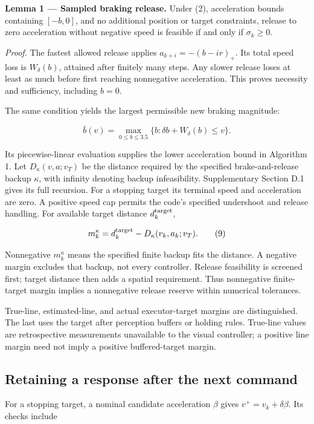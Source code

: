 \documentclass[letterpaper,journal]{IEEEtran}
\begin{document}
\textbf{Lemma 1 --- Sampled braking release.} Under (2), acceleration bounds containing \([-b,0]\), and no additional position or target constraints, release to zero acceleration without negative speed is feasible if and only if \(\sigma_k\ge0\).

\emph{Proof.} The fastest allowed release applies \(a_{k+i}=-(b-ir)_+\). Its total speed loss is \(W_\delta(b)\), attained after finitely many steps. Any slower release loses at least as much before first reaching nonnegative acceleration. This proves necessity and sufficiency, including \(b=0\).

The same condition yields the largest permissible new braking magnitude:

\[\bar b(v)=\max_{0\le b\le3.5}\{b:\delta b+W_\delta(b)\le v\}.\tag{8}\]

Its piecewise-linear evaluation supplies the lower acceleration bound in Algorithm 1. Let \(D_\kappa(v,a;v_T)\) be the distance required by the specified brake-and-release backup \(\kappa\), with infinity denoting backup infeasibility. Supplementary Section D.1 gives its full recursion. For a stopping target its terminal speed and acceleration are zero. A positive speed cap permits the code's specified undershoot and release handling. For available target distance \(d_k^{\rm target}\),

\[m_k^\kappa=d_k^{\rm target}-D_\kappa(v_k,a_k;v_T).\tag{9}\]

Nonnegative \(m_k^\kappa\) means the specified finite backup fits the distance. A negative margin excludes that backup, not every controller. Release feasibility is screened first; target distance then adds a spatial requirement. Thus nonnegative finite-target margin implies a nonnegative release reserve within numerical tolerances.

True-line, estimated-line, and actual executor-target margins are distinguished. The last uses the target after perception buffers or holding rules. True-line values are retrospective measurements unavailable to the visual controller; a positive line margin need not imply a positive buffered-target margin.

\subsection{Retaining a response after the next command}

For a stopping target, a nominal candidate acceleration \(\beta\) gives \(v^+=v_k+\delta\beta\). Its checks include
\end{document}
